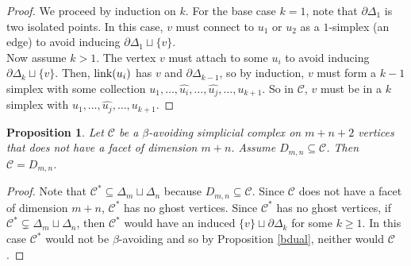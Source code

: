 \documentclass[letterpaper,12pt]{amsart}
\theoremstyle{plain}
\newtheorem{prop}[thm]{Proposition}
\theoremstyle{definition}
\theoremstyle{remark}
\newcommand{\calc}{\mathcal{C}}
\newcommand{\link}{\textnormal{link}}
\begin{document}
\begin{proof}
	We proceed by induction on $k$.
	For the base case $k=1$, note that $\partial\Delta_1$ is two isolated points.
	In this case, $v$ must connect to $u_1$ or $u_2$
	as a $1$-simplex (an edge) to avoid inducing $\partial\Delta_1 \sqcup \{v\}$.
	\\
	\indent
	Now assume $k>1$.
	The vertex $v$ must attach to some $u_i$ to avoid inducing $\partial\Delta_k \sqcup \{v\}$.
	Then, $\link(u_i)$ has $v$ and $\partial\Delta_{k-1}$,
	so by induction, $v$ must form a $k-1$ simplex with some collection $u_1,\dots,\hat{u_i},\dots,\hat{u_j},\dots,u_{k+1}$.
	So in $\mathcal{C}$, $v$ must be in a $k$ simplex with $u_1,\dots,\hat{u_j},\dots,u_{k+1}$.
\end{proof}


\begin{prop}\label{minimality}
	Let $\mathcal{C}$ be a $\beta$-avoiding simplicial complex on $m+n+2$ vertices that does not have a facet of dimension $m+n$.
	Assume $D_{m,n} \subseteq \mathcal{C}$.
	Then $\mathcal{C} = D_{m,n}$.
\end{prop}
\begin{proof}
	{ Note that $\mathcal{C}^* \subseteq \Delta_m \sqcup \Delta_n$ because $D_{m,n} \subseteq \mathcal{C}$.
	Since $\mathcal{C}$ does not have a facet of dimension $m+n$, $\calc^*$ has no ghost vertices.
	Since $\calc^*$ has no ghost vertices, if $\calc^* \subsetneq \Delta_m \sqcup \Delta_n$,
	then $\calc^*$ would have an induced $\{v\} \sqcup \partial \Delta_k$ for some $k \geq 1$.
	In this case $\calc^*$ would not be $\beta$-avoiding and so by Proposition \ref{bdual}, neither would $\calc$.}
\end{proof}
\end{document}
